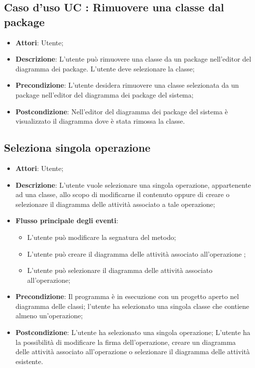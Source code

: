 \documentclass[../AnalisiDeiRequisiti.tex]{subfiles}
\begin{document}
		\subsection{Caso d'uso UC : Rimuovere una classe dal package}
			\begin{itemize}
				\item \textbf{Attori}: Utente;
				\item \textbf{Descrizione}: L'utente può rimuovere una classe da un package
				nell'editor del diagramma dei package. L'utente deve selezionare
				la classe;
				\item \textbf{Precondizione}: L'utente desidera rimuovere una classe
				selezionata da un package nell'editor del diagramma dei package del sistema;
				\item \textbf{Postcondizione}: Nell'editor del diagramma dei package del
				sistema è visualizzato il diagramma dove è stata rimossa la classe.
			\end{itemize}
			
			\subsection{Seleziona singola operazione}
			\begin{itemize}
				\item \textbf{Attori}: Utente;
				\item \textbf{Descrizione}: L'utente vuole selezionare una singola operazione, appartenente ad una classe,  allo scopo di modificarne il contenuto oppure di creare o selezionare il diagramma delle attività associato a tale operazione;
				\item \textbf{Flusso principale degli eventi}: 
				\begin{itemize}
					\item L'utente può modificare la segnatura del metodo;
					\item L'utente può creare il diagramma delle attività associato all'operazione ;
					\item L'utente può selezionare il diagramma delle attività associato all'operazione;
				\end{itemize}
				\item \textbf{Precondizione}: Il programma è in esecuzione con un progetto aperto nel diagramma delle classi; l'utente ha selezionato una singola classe che contiene almeno un'operazione; 
				\item \textbf{Postcondizione}: L'utente ha selezionato una singola operazione; L'utente ha la possibilità di modificare la firma dell'operazione, creare un diagramma delle attività associato all'operazione o selezionare il diagramma delle attività esistente.
			\end{itemize}
\end{document}
